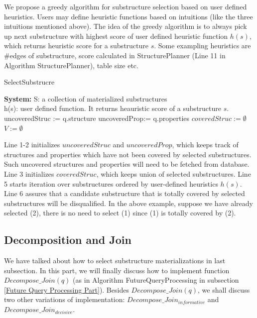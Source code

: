 We propose a greedy algorithm for substructure selection based on user defined heuristics. Users may define heuristic functions based on intuitions (like the three intuitions mentioned above). The idea of the greedy algorithm is to always pick up next substructure with highest  score of user defined heuristic function $h(s)$, which returns heuristic score for a substructure $s$. Some exampling heuristics are \#edges of substructure, score calculated in StructurePlanner (Line 11 in Algorithm StructurePlanner), table size etc. 

\begin{algorithm}[H]
\caption{SelectSubstrucre}
\LinesNumbered
\textbf{System:} S: a collection of materialized substructures\\ h(s): user defined function. It returns heauristic score of a substructure $s$.\\
uncoveredStruc := q.structure\;
uncoveredProp:= q.properties\; 
$coveredStruc:= \emptyset$\;
$V:=\emptyset $\;
\end{algorithm}
\clearpage

Line 1-2 initializes $uncoveredStruc$ and $uncoveredProp$, which keeps track of structures and properties which have not been covered by selected substructures. Such uncovered structures and properties will need to be fetched from database. Line 3 initializes $coveredStruc$, which keeps union of selected substructures. Line 5 starts iteration over substructures ordered by user-defined heuristics $h(s)$. Line 6 assures that a candidate substructure that is totally covered by selected substructures will be disqualified. In the above example, suppose we have already selected (2), there is no need to select (1) since (1) is totally covered by (2). 

\subsection{Decomposition and Join}
\label{Query Decomposition}
We have talked about how to select substructure materializations in last subsection. In this part, we will finally discuss how to implement function $Decompose\_Join(q)$ (as in Algorithm FutureQueryProcessing in subsection \ref{Future Query Processing Part}). Besides $Decompose\_Join(q)$, we shall discuss two other variations of implementation: $Decompose\_Join_{informative}$ and $Decompose\_Join_{decisive}$. 

